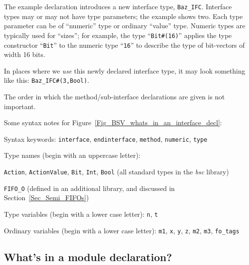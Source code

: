 The example declaration introduces a new interface type,
\verb|Baz_IFC|.  Interface types may or may not have type parameters;
the example shows two.  Each type parameter can be of ``numeric'' type
or ordinary ``value'' type.  Numeric types are typically used for
``sizes''; for example, the type ``\verb|Bit#(16)|'' applies the type
constructor ``\verb|Bit|'' to the numeric type ``\verb|16|'' to
describe the type of bit-vectors of width 16 bits.

In places where we \emph{use} this newly declared interface type, it
may look something like this: \verb|Baz_IFC#(3,Bool)|.

The order in which the method/sub-interface declarations are given is
not important.

Some syntax notes for Figure~\ref{Fig_BSV_whats_in_an_interface_decl}:
\begin{tightlist}

 \item Syntax keywords: \verb|interface|, \verb|endinterface|,
       \verb|method|, \verb|numeric|, \verb|type|

 \item Type names (begin with an uppercase letter):
  \begin{tightlist}

   \item \verb|Action|, \verb|ActionValue|, \verb|Bit|, \verb|Int|,
         \verb|Bool| (all standard types in the \emph{bsc} library)

   \item \verb|FIFO_O| (defined in an additional {\BSV} library,
          and discussed in Section~\ref{Sec_Semi_FIFOs})
  \end{tightlist}

 \item Type variables (begin with a lower case letter): \verb|n|, \verb|t|

 \item Ordinary variables (begin with a lower case letter): \verb|m1|,
       \verb|x|, \verb|y|, \verb|z|, \verb|m2|, \verb|m3|,
       \verb|fo_tags|

\end{tightlist}


\subsection{What's in a module declaration?}

